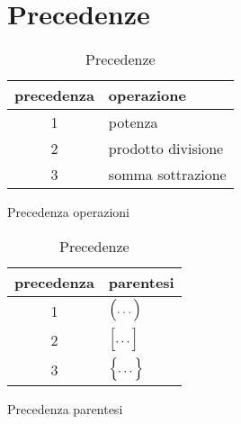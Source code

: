 \section{Precedenze}
\label{sec:Precedenze operazioni}
\begin{table}[H]
	\begin{subtable}[b]{.5\linewidth}
		\centering
		\begin{tabular}{cl}
			\toprule
			precedenza&operazione\\
			\midrule
			\phantom{$\Bigl($}1&potenza\\[.4cm]
			\phantom{$\Bigl[$}2& prodotto divisione\\[.4cm]
			\phantom{$\Bigl\{$}3& somma sottrazione\\[.4cm]
			\bottomrule
		\end{tabular}
		\caption{Precedenza operazioni}\label{tab:precedenzaoperazioni}
	\end{subtable}%
	\begin{subtable}[b]{.5\linewidth}
		\centering
		\begin{tabular}{cl}
			\toprule
			precedenza&parentesi\\
			\midrule
			1&$\Bigl(\dots\Bigr)$\\[.4cm]
			2& $\Bigl[\dots\Bigr]$\\[.4cm]
			3& $\Bigl\{\dots\Bigr\}$\\[.4cm]
			\bottomrule
		\end{tabular}
		\caption{Precedenza parentesi}\label{tab:precedenzaparentesi}
	\end{subtable}
	\caption{Precedenze}
	\label{Tab:precedenze}
\end{table}
%

